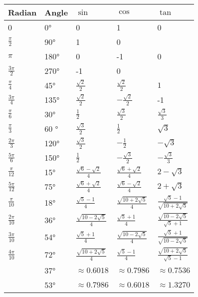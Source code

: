 \documentclass[a4paper,12pt]{report}
\begin{document}
\begin{longtable}[c]{|p{}|p{}|p{}|p{}|p{}|}
\hline
Radian & Angle & $\sin$ & $\cos$ & $\tan$ \\\hline\endhead
0 & 0° & 0 & 1 & 0 \\\hline
$\frac{\pi}{2}$ & 90° & 1 & 0 & \\\hline
$\pi$ & 180° & 0 & -1 & 0 \\\hline
$\frac{3\pi}{2}$ & 270° & -1 & 0 & \\\hline
$\frac{\pi}{4}$ & 45° & $\frac{\sqrt{2}}{2}$ & $\frac{\sqrt{2}}{2}$ & $1$ \\\hline
$\frac{3\pi}{4}$ & 135° & $\frac{\sqrt{2}}{2}$ & $-\frac{\sqrt{2}}{2}$ & -1 \\\hline
$\frac{\pi}{6}$ & 30° & $\frac{1}{2}$ & $\frac{\sqrt{3}}{2}$ & $\frac{\sqrt{3}}{3}$ \\\hline
$\frac{\pi}{3}$ & 60 ° & $\frac{\sqrt{3}}{2}$ & $\frac{1}{2}$ & $\sqrt{3}$ \\\hline
$\frac{2\pi}{3}$ & 120° & $\frac{\sqrt{3}}{2}$ & $-\frac{1}{2}$ & $-\sqrt{3}$ \\\hline
$\frac{5\pi}{6}$ & 150° & $\frac{1}{2}$ & $-\frac{\sqrt{3}}{2}$ & $-\frac{\sqrt{3}}{3}$ \\\hline
$\frac{\pi}{12}$ & 15° & $\frac{\sqrt{6}-\sqrt{2}}{4}$ & $\frac{\sqrt{6}+\sqrt{2}}{4}$ & $2-\sqrt{3}$ \\\hline
$\frac{5\pi}{12}$ & 75° & $\frac{\sqrt{6}+\sqrt{2}}{4}$ & $\frac{\sqrt{6}-\sqrt{2}}{4}$ & $2+\sqrt{3}$ \\\hline
$\frac{\pi}{10}$ & 18° & $\frac{\sqrt{5}-1}{4}$ & $\frac{\sqrt{10+2\sqrt{5}}}{4}$ & $\frac{\sqrt{5}-1}{\sqrt{10+2\sqrt{5}}}$ \\\hline
$\frac{2\pi}{10}$ & 36° & $\frac{\sqrt{10-2\sqrt{5}}}{4}$ & $\frac{\sqrt{5}+1}{4}$ & $\frac{\sqrt{10-2\sqrt{5}}}{\sqrt{5}+1}$ \\\hline
$\frac{3\pi}{10}$ & 54° & $\frac{\sqrt{5}+1}{4}$ & $\frac{\sqrt{10-2\sqrt{5}}}{4}$ & $\frac{\sqrt{5}+1}{\sqrt{10-2\sqrt{5}}}$ \\\hline
$\frac{4\pi}{10}$ & 72° & $\frac{\sqrt{10+2\sqrt{5}}}{4}$ & $\frac{\sqrt{5}-1}{4}$ & $\frac{\sqrt{10+2\sqrt{5}}}{\sqrt{5}-1}$ \\\hline
& 37° & $\approx 0.6018$ & $\approx 0.7986$ & $\approx 0.7536$ \\\hline
& 53° & $\approx 0.7986$ & $\approx 0.6018$ & $\approx 1.3270$ \\\hline
\end{longtable}
\end{document}
